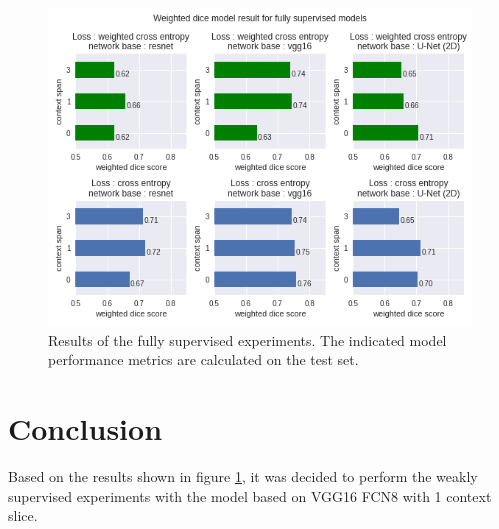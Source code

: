 \begin{figure}
    \centering
    \includegraphics[width=.95\textwidth]{images/FullySupervised.png}
    \caption{Results of the fully supervised experiments.
    The indicated model performance metrics are calculated on the test set.
    \label{fig:referenceExperiments}}
\end{figure}


\section{Conclusion}
Based on the results shown in figure \ref{fig:referenceExperiments}, it was decided to perform the weakly supervised experiments with the model based on VGG16 FCN8 with 1 context slice.